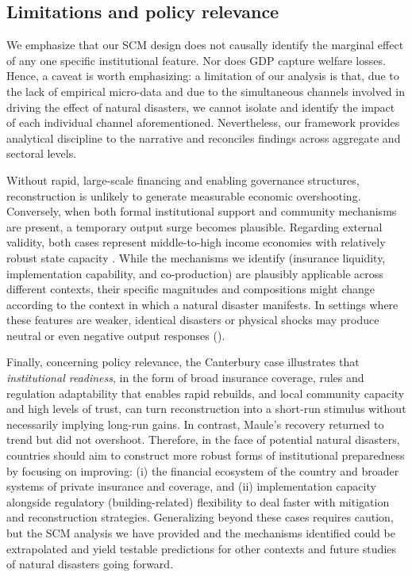 \documentclass[12pt]{article}
\begin{document}
\subsection{Limitations and policy relevance}
We emphasize that our SCM design does not causally identify the marginal effect of any one specific institutional feature. Nor does GDP capture welfare losses. Hence, a caveat is worth emphasizing: a limitation of our analysis is that, due to the lack of empirical micro-data and due to the simultaneous channels involved in driving the effect of natural disasters, we cannot isolate and identify the impact of each individual channel aforementioned. Nevertheless, our framework provides analytical discipline to the narrative and reconciles findings across aggregate and sectoral levels. 

Without rapid, large-scale financing and enabling governance structures, reconstruction is unlikely to generate measurable economic overshooting. Conversely, when both formal institutional support and community mechanisms are present, a temporary output surge becomes plausible. Regarding external validity, both cases represent middle-to-high income economies with relatively robust state capacity \parencite{miller2013estimating, gonzalez2020diversificacion}. While the mechanisms we identify (insurance liquidity, implementation capability, and co-production) are plausibly applicable across different contexts, their specific magnitudes and compositions might change according to the context in which a natural disaster manifests. In settings where these features are weaker, identical disasters or physical shocks may produce neutral or even negative output responses (\cite{farzanegan2025bam, loayza2012natural}).

Finally, concerning policy relevance, the Canterbury case illustrates that \textit{institutional readiness}, in the form of broad insurance coverage, rules and regulation adaptability that enables rapid rebuilds, and local community capacity and high levels of trust, can turn reconstruction into a short-run stimulus without necessarily implying long-run gains. In contrast, Maule’s recovery returned to trend but did not overshoot. Therefore, in the face of potential natural disasters, countries should aim to construct more robust forms of institutional preparedness by focusing on improving: (i) the financial ecosystem of the country and broader systems of private insurance and coverage, and (ii) implementation capacity alongside regulatory (building-related) flexibility to deal faster with mitigation and reconstruction strategies. Generalizing beyond these cases requires caution, but the SCM analysis we have provided and the mechanisms identified could be extrapolated and yield testable predictions for other contexts and future studies of natural disasters going forward.
\end{document}
